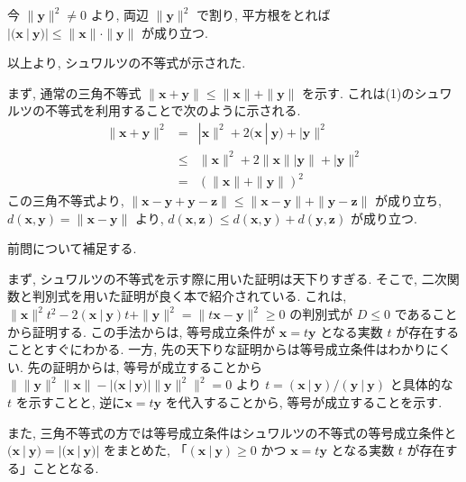 \documentclass[dvipdfmx,a4j]{jarticle}
\newcounter{pn}     %
\let\np\newpage
\renewcommand{\newpage}{
    \np
    \addtocounter{pn}{1}
}
\begin{document}
{\begin{enumerate}
    今 $\|\bm{y}\|^2 \neq 0$ より, 両辺 $\|\bm{y}\|^2$ で割り, 平方根をとれば $|(\bm{x}\ |\ \bm{y})| \leq \|\bm{x}\|\cdot \|\bm{y}\|$ が成り立つ.
\end{enumerate}
以上より, シュワルツの不等式が示された.
\item まず, 通常の三角不等式 $\|\bm{x} + \bm{y}\| \leq \|\bm{x}\| + \|\bm{y}\|$ を示す.
これは(1)のシュワルツの不等式を利用することで次のように示される.
\begin{eqnarray*}
    \|\bm{x} + \bm{y}\|^2 &=& |\bm{x}\|^2 + 2(\bm{x}\ |\ \bm{y}) + |\bm{y}\|^2\\
    &\leq& \|\bm{x}\|^2 + 2\|\bm{x}\||\bm{y}\| + |\bm{y}\|^2\\
    &=& (\|\bm{x}\| + \|\bm{y}\|)^2
\end{eqnarray*}
この三角不等式より, $\|\bm{x} - \bm{y} + \bm{y} - \bm{z}\| \leq \|\bm{x} -\bm{y}\| + \|\bm{y} - \bm{z}\|$ が成り立ち, $d(\bm{x}, \bm{y}) = \|\bm{x} - \bm{y}\|$ より, 
$d(\bm{x}, \bm{z}) \leq d(\bm{x}, \bm{y}) + d(\bm{y}, \bm{z})$ が成り立つ.
}
\newpage
前問について補足する.

まず, シュワルツの不等式を示す際に用いた証明は天下りすぎる. そこで, 二次関数と判別式を用いた証明が良く本で紹介されている.
これは, $\|\bm{x}\|^2t^2 - 2(\bm{x}\ |\ \bm{y})t + \|\bm{y}\|^2 = \| t\bm{x} - \bm{y}\|^2 \geq 0$ の判別式が $D \leq 0$ であることから証明する.
この手法からは, 等号成立条件が $\bm{x} = t\bm{y}$ となる実数 $t$ が存在することとすぐにわかる. 一方, 先の天下りな証明からは等号成立条件はわかりにくい.
先の証明からは, 等号が成立することから $\| \|\bm{y}\|^2\|\bm{x}\| - |(\bm{x}\ |\ \bm{y})| \|\bm{y}\|^2 \|^2 = 0$ より $t = (\bm{x}\ |\ \bm{y})/(\bm{y}\ |\ \bm{y})$ と具体的な $t$ を示すことと, 
逆に$\bm{x} = t\bm{y}$ を代入することから, 等号が成立することを示す. 

また, 三角不等式の方では等号成立条件はシュワルツの不等式の等号成立条件と $(\bm{x}\ |\ \bm{y}) = |(\bm{x}\ |\ \bm{y})|$ をまとめた, 
「$(\bm{x}\ |\ \bm{y}) \geq 0$ かつ $\bm{x} = t\bm{y}$ となる実数 $t$ が存在する」こととなる.
\end{document}
